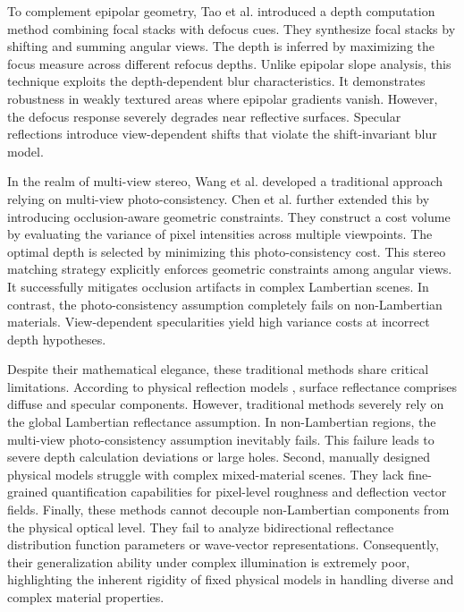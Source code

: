 \documentclass[lettersize,journal]{IEEEtran}
\begin{document}
To complement epipolar geometry, Tao et al. \cite{tao2013} introduced a depth computation method combining focal stacks with defocus cues. They synthesize focal stacks by shifting and summing angular views. The depth is inferred by maximizing the focus measure across different refocus depths. Unlike epipolar slope analysis, this technique exploits the depth-dependent blur characteristics. It demonstrates robustness in weakly textured areas where epipolar gradients vanish. However, the defocus response severely degrades near reflective surfaces. Specular reflections introduce view-dependent shifts that violate the shift-invariant blur model.

In the realm of multi-view stereo, Wang et al. \cite{wang2015} developed a traditional approach relying on multi-view photo-consistency. Chen et al. \cite{chen2017} further extended this by introducing occlusion-aware geometric constraints. They construct a cost volume by evaluating the variance of pixel intensities across multiple viewpoints. The optimal depth is selected by minimizing this photo-consistency cost. This stereo matching strategy explicitly enforces geometric constraints among angular views. It successfully mitigates occlusion artifacts in complex Lambertian scenes. In contrast, the photo-consistency assumption completely fails on non-Lambertian materials. View-dependent specularities yield high variance costs at incorrect depth hypotheses.

Despite their mathematical elegance, these traditional methods share critical limitations. According to physical reflection models \cite{blinn1977}, surface reflectance comprises diffuse and specular components. However, traditional methods severely rely on the global Lambertian reflectance assumption. In non-Lambertian regions, the multi-view photo-consistency assumption inevitably fails. This failure leads to severe depth calculation deviations or large holes. Second, manually designed physical models struggle with complex mixed-material scenes. They lack fine-grained quantification capabilities for pixel-level roughness and deflection vector fields. Finally, these methods cannot decouple non-Lambertian components from the physical optical level. They fail to analyze bidirectional reflectance distribution function parameters or wave-vector representations. Consequently, their generalization ability under complex illumination is extremely poor, highlighting the inherent rigidity of fixed physical models in handling diverse and complex material properties.
\end{document}
